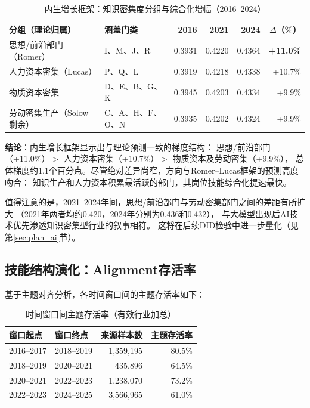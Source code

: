 \documentclass[12pt,a4paper]{ctexart}
\begin{document}
\begin{table}[H]
\centering
\caption{内生增长框架：知识密集度分组与综合化增幅（2016--2024）}
\begin{tabular}{llrrrr}
\toprule
分组（理论归属） & 涵盖门类 & 2016 & 2021 & 2024 & $\Delta$（\%） \\
\midrule
思想/前沿部门（Romer） & I、M、J、R & 0.3931 & 0.4220 & 0.4364 & \textbf{+11.0\%} \\
人力资本密集（Lucas） & P、Q、L & 0.3919 & 0.4218 & 0.4338 & +10.7\% \\
物质资本密集 & D、E、B、G、K & 0.3945 & 0.4203 & 0.4334 & +9.9\% \\
劳动密集生产（Solow剩余） & C、A、H、F、O、N & 0.3935 & 0.4202 & 0.4324 & +9.9\% \\
\bottomrule
\end{tabular}
\end{table}

\textbf{结论}：内生增长框架显示出与理论预测一致的梯度结构：
思想/前沿部门（+11.0\%）$>$ 人力资本密集（+10.7\%）$>$ 物质资本及劳动密集（+9.9\%），
总体梯度约1.1个百分点。尽管绝对差异尚窄，方向与Romer--Lucas框架的预测高度吻合：
知识生产和人力资本积累最活跃的部门，其岗位技能综合化提速最快。

值得注意的是，2021--2024年间，思想/前沿部门与劳动密集部门之间的差距有所扩大
（2021年两者均约0.420，2024年分别为0.436和0.432），
与大模型出现后AI技术优先渗透知识密集型行业的叙事相符。
这将在后续DID检验中进一步量化（见第\ref{sec:plan_ai}节）。

\subsection{技能结构演化：Alignment存活率}

基于主题对齐分析，各时间窗口间的主题存活率如下：

\begin{table}[H]
\centering
\caption{时间窗口间主题存活率（有效行业加总）}
\begin{tabular}{llrr}
\toprule
窗口起点 & 窗口终点 & 来源样本数 & 主题存活率 \\
\midrule
2016--2017 & 2018--2019 & 1,359,195 & 80.5\% \\
2018--2019 & 2020--2021 & 435,896 & 64.5\% \\
2020--2021 & 2022--2023 & 1,238,070 & 73.2\% \\
2022--2023 & 2024--2025 & 3,566,965 & 61.0\% \\
\bottomrule
\end{tabular}
\end{table}
\end{document}
